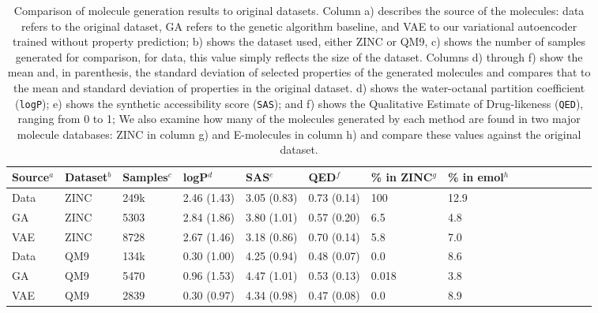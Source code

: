 \begin{table}[h]
\small
\centering
\begin{tabular}{lp{1cm}lp{1.3cm}lp{1cm}lp{1cm}lp{1cm}lp{0.6cm}lp{1cm}l}
\hline
  Source$^{a}$ & Dataset$^{b}$ &  Samples$^{c}$ &   logP$^{d}$ &      SAS$^{e}$  &   QED$^{f}$ & \% in ZINC$^{g}$ & \% in emol$^{h}$ \\
\hline
   Data &    ZINC &     249k &  2.46 (1.43) &  3.05 (0.83)  &  0.73 (0.14) & 100 & 12.9 \\
  GA &    ZINC &     5303 &  2.84 (1.86) &  3.80 (1.01) &  0.57 (0.20) &        6.5 &  4.8\\
    VAE &    ZINC &     8728 &  2.67 (1.46) &  3.18 (0.86) &  0.70 (0.14) &      5.8 & 7.0\\
\hline
Data &     QM9 &     134k &  0.30 (1.00) &  4.25 (0.94) &  0.48 (0.07)  &    0.0 & 8.6 \\
GA &     QM9 &     5470 &  0.96 (1.53) &  4.47 (1.01) &  0.53 (0.13)  &        0.018    & 3.8 \\
 VAE &     QM9 &     2839 &  0.30 (0.97) &  4.34 (0.98) &  0.47 (0.08) &        0.0  &  8.9\\
 \hline
 \end{tabular}
 \caption{
Comparison of molecule generation results to original datasets. Column a) describes the source of the molecules: data refers to the original dataset, GA refers to the genetic algorithm baseline, and VAE to our variational autoencoder trained without property prediction;  b) shows the dataset used, either ZINC or QM9, c) shows the number of samples generated for comparison, for data, this value simply reflects the size of the dataset. 
Columns d) through f) show the mean and, in parenthesis, the standard deviation of selected properties of the generated molecules and compares that to the mean and standard deviation of properties in the original dataset. 
 d) shows the water-octanal partition coefficient (\texttt{logP})\cite{wildman_1999_prediction}; e) shows the synthetic accessibility score (\texttt{SAS})\cite{Ertl2009estimation}; and f) shows the Qualitative Estimate of Drug-likeness (\texttt{QED})\cite{bickerton2012quantifying}, ranging from 0 to 1; 
We also examine how many of the molecules generated by each method are found in two major molecule databases: ZINC in column g) and E-molecules\cite{emolecules} in column h) and compare these values against the original dataset.
}
\label{tab:zinc_gen_results}
 \end{table}

